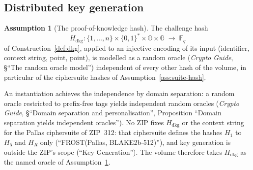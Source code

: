 \documentclass[11pt,a4paper]{article}
\theoremstyle{definition}
\newtheorem{assumption}[theorem]{Assumption}
\newcommand{\F}{\mathbb{F}}
\newcommand{\G}{\mathbb{G}}
\newcommand{\Fq}{\F_q}
\begin{document}
\subsection{Distributed key generation}\label{sec:keygen-dkg}

\begin{assumption}[The proof-of-knowledge hash]\label{ass:dkg-hash}
The challenge hash
\[
  H_{\mathrm{dkg}} \colon \{1, \dots, n\} \times \{0,1\}^{*} \times \G
  \times \G \;\to\; \Fq
\]
of Construction~\ref{def:dkg}, applied to an injective encoding of its input
(identifier, context string, point, point), is modelled as a random oracle
(\emph{Crypto Guide}, \S``The random oracle model'') independent of every
other hash of the volume, in particular of the ciphersuite hashes of
Assumption~\ref{ass:suite-hash}.
\end{assumption}

An instantiation achieves the independence by domain separation: a random
oracle restricted to prefix-free tags yields independent random oracles
(\emph{Crypto Guide}, \S``Domain separation and personalisation'',
Proposition ``Domain separation yields independent oracles''). No ZIP fixes
\(H_{\mathrm{dkg}}\) or the context string for the Pallas ciphersuite of
ZIP~312: that ciphersuite defines the hashes \(H_1\) to \(H_5\) and
\(H_R\) only (``FROST(Pallas, BLAKE2b-512)''), and key generation is outside
the ZIP's scope (``Key Generation''). The volume therefore takes
\(H_{\mathrm{dkg}}\) as the named oracle of Assumption~\ref{ass:dkg-hash}.
\end{document}
